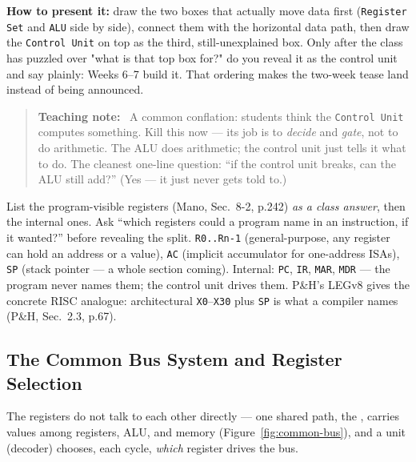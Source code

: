 \documentclass[11pt]{article}
\newenvironment{teachingaside}{\begin{quote}\small\color{primary-gold}\textbf{Teaching note:}\ }{\end{quote}}
\begin{document}
\textbf{How to present it:} draw the two boxes that actually move data first (\texttt{Register Set} and \texttt{ALU} side by side), connect them with the horizontal data path, then draw the \texttt{Control Unit} on top as the third, still-unexplained box. Only after the class has puzzled over "what is that top box for?" do you reveal it as the control unit and say plainly: Weeks 6--7 build it. That ordering makes the two-week tease land instead of being announced.

\begin{teachingaside}
A common conflation: students think the \texttt{Control Unit} computes something. Kill this now --- its job is to \emph{decide} and \emph{gate}, not to do arithmetic. The ALU does arithmetic; the control unit just tells it what to do. The cleanest one-line question: ``if the control unit breaks, can the ALU still add?'' (Yes --- it just never gets told to.)
\end{teachingaside}

List the program-visible registers (Mano, Sec.~8-2, p.242) \emph{as a class answer}, then the internal ones. Ask ``which registers could a program name in an instruction, if it wanted?'' before revealing the split. \texttt{R0..Rn-1} (general-purpose, any register can hold an address or a value), \texttt{AC} (implicit accumulator for one-address ISAs), \texttt{SP} (stack pointer --- a whole section coming). Internal: \texttt{PC}, \texttt{IR}, \texttt{MAR}, \texttt{MDR} --- the program never names them; the control unit drives them. P\&H's LEGv8 gives the concrete RISC analogue: architectural \texttt{X0}--\texttt{X30} plus \texttt{SP} is what a compiler names (P\&H, Sec.~2.3, p.67).

\subsection{The Common Bus System and Register Selection}

The registers do not talk to each other directly --- one shared path, the , carries values among registers, ALU, and memory (Figure~\ref{fig:common-bus}), and a  unit (decoder) chooses, each cycle, \emph{which} register drives the bus.
\end{document}
